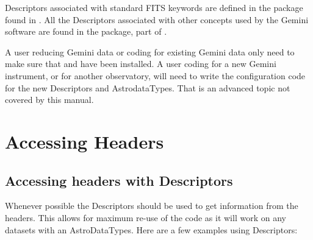 \documentclass[letterpaper,10pt,english]{sphinxmanual}
\begin{document}
Descriptors associated with standard FITS keywords are defined in the
 package found in .  All the Descriptors
associated with other concepts used by the Gemini software are found in the
 package, part of .

A user reducing Gemini data or coding for existing Gemini data only need to
make sure that  and  have been
installed.  A user coding for a new Gemini instrument, or for another
observatory, will need to write the configuration code for the new Descriptors
and AstrodataTypes.  That is an advanced topic not covered by this manual.


\section{Accessing Headers}
\label{headers:accessing-headers}

\subsection{Accessing headers with Descriptors}
\label{headers:accessing-headers-with-descriptors}
Whenever possible the Descriptors should be used to get information from the
headers.  This allows for maximum re-use of the code as it will work on any
datasets with an AstroDataTypes. Here are a few examples using Descriptors:
\end{document}
